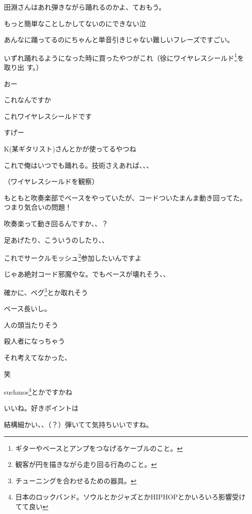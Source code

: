 \begin{multicols}{3}
田淵さんはあれ弾きながら踊れるのかよ、ておもう。

もっと簡単なことしかしてないのにできない泣

あんなに踊ってるのにちゃんと単音引きじゃない難しいフレーズですごい。

いずれ踊れるようになった時に買ったやつがこれ（徐にワイヤレスシールド\footnote{ギターやベースとアンプをつなげるケーブルのこと。}を取り出
す。）

おー

これなんですか

これワイヤレスシールドです

すげー

K(某ギタリスト)さんとかが使ってるやつね

これで俺はいつでも踊れる。技術さえあれば、、、

（ワイヤレスシールドを観察）

もともと吹奏楽部でベースをやっていたが、コードついたまんま動き回ってた。つまり気合いの問題！

吹奏楽って動き回るんですか、、？

足あげたり、こういうのしたり、、

これでサークルモッシュ\footnote{観客が円を描きながら走り回る行為のこと。}参加したいんですよ

じゃあ絶対コード邪魔やな。でもベースが壊れそう、、

確かに、ペグ\footnote{チューニングを合わせるための器具。
}とか取れそう

ベース長いし。

人の頭当たりそう

殺人者になっちゃう

それ考えてなかった、

笑
 

suchmos\footnote{日本のロックバンド。ソウルとかジャズとかHIPHOPとかいろいろ影響受けてて良い}とかですかね

いいね。好きポイントは

結構細かい、、（？）弾いてて気持ちいいですね。


\end{multicols}
